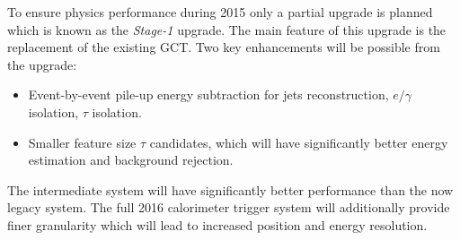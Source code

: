 To ensure physics performance during 2015 only a partial upgrade is planned which is known as the \textit{Stage-1} upgrade. The main feature of this upgrade is the replacement of the existing \gls{GCT}. Two key enhancements will be possible from the upgrade: 

\begin{itemize}
  \item Event-by-event pile-up energy subtraction for jets reconstruction, $e/\gamma$ isolation, $\tau$ isolation.
  \item Smaller feature size $\tau$ candidates, which will have significantly better energy estimation and background rejection.
\end{itemize}

The intermediate system will have significantly better performance than the now legacy system. The full 2016 calorimeter trigger system will additionally provide finer granularity which will lead to increased position and energy resolution. 
